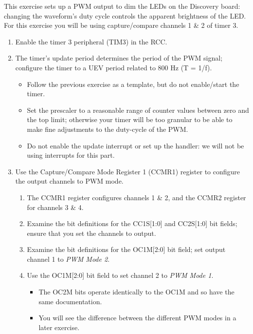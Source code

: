 \documentclass[openany,11pt,fleqn]{book} %
\begin{document}
\begin{exercise}
    \label{ex2}
    This exercise sets up a PWM output to dim the LEDs on the Discovery board: changing the waveform's duty cycle controls the apparent brightness of the LED. For this exercise you will be using capture/compare channels 1 \& 2 of timer 3. 
    
    \begin{enumerate}
        \item Enable the timer 3 peripheral (TIM3) in the RCC.
        \item The timer's update period determines the period of the PWM signal; configure the timer to a UEV period related to 800 Hz (T = 1/f).  
        \begin{itemize}
            \item Follow the previous exercise as a template, but do not enable/start the timer.
            \item Set the prescaler to a reasonable range of counter values between zero and the top limit; otherwise your timer will be too granular to be able to make fine adjustments to the duty-cycle of the PWM.
            \item Do not enable the update interrupt or set up the handler: we will not be using interrupts for this part.
        \end{itemize}
        \item Use the Capture/Compare Mode Register 1 (CCMR1) register to configure the output channels to PWM mode.
        \begin{enumerate}
            \item The CCMR1 register configures channels 1 \& 2, and the CCMR2 register for channels 3 \& 4.
            \item Examine the bit definitions for the CC1S[1:0] and CC2S[1:0] bit fields; ensure that you set the channels to output. 
            \item Examine the bit definitions for the OC1M[2:0] bit field; set output channel 1 to \textit{PWM Mode 2}.
            \item Use the OC1M[2:0] bit field to set channel 2 to \textit{PWM Mode 1}.
            \begin{itemize}
                \item The OC2M bits operate identically to the OC1M and so have the same documentation. 
                \item You will see the difference between the different PWM modes in a later exercise.

\end{itemize}
\end{enumerate}
\end{enumerate}
\end{exercise}
\end{document}

